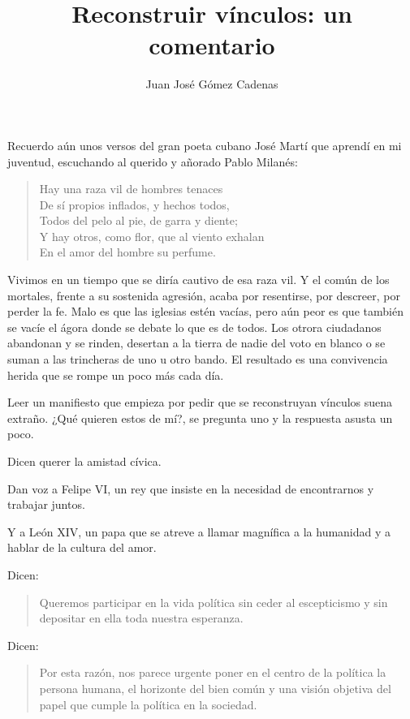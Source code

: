\documentclass[11pt,a4paper]{article}
\title{Reconstruir vínculos: un comentario}
\author{Juan José Gómez Cadenas}
\date{}
\begin{document}
\maketitle

Recuerdo aún unos versos del gran poeta cubano José Martí que aprendí en mi juventud, escuchando al querido y añorado Pablo Milanés:

\begin{verse}
Hay una raza vil de hombres tenaces\\
De sí propios inflados, y hechos todos,\\
Todos del pelo al pie, de garra y diente;\\
Y hay otros, como flor, que al viento exhalan\\
En el amor del hombre su perfume.
\end{verse}

Vivimos en un tiempo que se diría cautivo de esa raza vil. Y el común de los mortales, frente a su sostenida agresión, acaba por resentirse, por descreer, por perder la fe. Malo es que las iglesias estén vacías, pero aún peor es que también se vacíe el ágora donde se debate lo que es de todos. Los otrora ciudadanos abandonan y se rinden, desertan a la tierra de nadie del voto en blanco o se suman a las trincheras de uno u otro bando. El resultado es una convivencia herida que se rompe un poco más cada día.

Leer un manifiesto que empieza por pedir que se reconstruyan vínculos suena extraño. ¿Qué quieren estos de mí?, se pregunta uno y la respuesta asusta un poco.

Dicen querer la amistad cívica.

Dan voz a Felipe VI, un rey que insiste en la necesidad de encontrarnos y trabajar juntos.

Y a León XIV, un papa que se atreve a llamar magnífica a la humanidad y a hablar de la cultura del amor.

Dicen:

\begin{quotation}
Queremos participar en la vida política sin ceder al escepticismo y sin depositar en ella toda nuestra esperanza.
\end{quotation}

Dicen:

\begin{quotation}
Por esta razón, nos parece urgente poner en el centro de la política la persona humana, el horizonte del bien común y una visión objetiva del papel que cumple la política en la sociedad.
\end{quotation}
\end{document}
